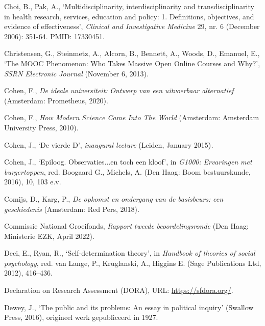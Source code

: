 \documentclass[smallauthor, chapterhaspagenum, nochapterinheader, pagenuminheader,  bigchapnum,medium2, tocpages, garamond, titleinheader]{jote-book}
\begin{document}
\begin{references}
		Choi, B., Pak, A., ‘Multidisciplinarity, interdisciplinarity and transdisciplinarity in health research, services, education and policy: 1. Definitions, objectives, and evidence of effectiveness', \emph{Clinical and Investigative Medicine} 29, nr. 6 (December 2006): 351-64. PMID: 17330451.



		Christensen, G., Steinmetz, A., Alcorn, B., Bennett, A., Woods, D., Emanuel, E., ‘The MOOC Phenomenon: Who Takes Massive Open Online Courses and Why?', \emph{SSRN Electronic Journal }(November 6, 2013).



		Cohen, F., \emph{De }\emph{ideale}\emph{ }\emph{universiteit}\emph{: }\emph{Ontwerp}\emph{ van }\emph{een}\emph{ }\emph{uitvoerbaar}\emph{ }\emph{alternatief} (Amsterdam: Prometheus, 2020).



		Cohen, F.,\emph{ How Modern Science Came Into The World} (Amsterdam: Amsterdam University Press, 2010).



		Cohen, J., ‘De vierde D', \emph{inaugural lecture }(Leiden, January 2015)\emph{.}



		Cohen, J., ‘Epiloog. Observaties...en toch een kloof', in \emph{G1000: }\emph{Ervaringen}\emph{ met }\emph{burgertoppen}, red. Boogaard G., Michels, A. (Den Haag: Boom bestuurskunde, 2016), 10, 103 e.v.



		Comijs, D., Karg, P., \emph{De }\emph{opkomst}\emph{ }\emph{en}\emph{ }\emph{ondergang}\emph{ van de }\emph{basisbeurs}\emph{: }\emph{een}\emph{ }\emph{geschiedenis} (Amsterdam: Red Pers, 2018).



		Commissie National Groeifonds, \emph{Rapport }\emph{tweede}\emph{ }\emph{beoordelingsronde} (Den Haag: Ministerie EZK, April 2022).



		Deci, E., Ryan, R., ‘Self-determination theory', in \emph{Handbook of theories of social psychology}, red. van Lange, P., Kruglanski, A., Higgins E. (Sage Publications Ltd, 2012), 416--436.



		Declaration on Research Assessment (DORA), URL: \href{https://sfdora.org/}{https://sfdora.org/}.



		Dewey, J., ‘The public and its problems: An essay in political inquiry' (Swallow Press, 2016), origineel werk gepubliceerd in 1927.




\end{references}
\end{document}
